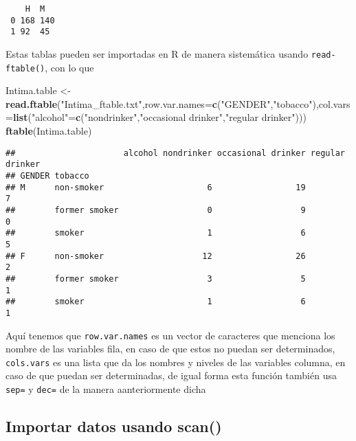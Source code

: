 \documentclass[]{article}
\newenvironment{Shaded}{\begin{snugshade}}{\end{snugshade}}
\newcommand{\KeywordTok}[1]{\textcolor[rgb]{0.13,0.29,0.53}{\textbf{#1}}}
\newcommand{\DataTypeTok}[1]{\textcolor[rgb]{0.13,0.29,0.53}{#1}}
\newcommand{\StringTok}[1]{\textcolor[rgb]{0.31,0.60,0.02}{#1}}
\newcommand{\NormalTok}[1]{#1}
\begin{document}
\begin{verbatim}
    H  M
 0 168 140
 1 92  45
\end{verbatim}

Estas tablas pueden ser importadas en R de manera sistemática usando
\texttt{read-ftable()}, con lo que

\begin{Shaded}
\begin{Highlighting}[]
\NormalTok{Intima.table <-}\StringTok{ }\KeywordTok{read.ftable}\NormalTok{(}\StringTok{"Intima_ftable.txt"}\NormalTok{,}\DataTypeTok{row.var.names=}\KeywordTok{c}\NormalTok{(}\StringTok{"GENDER"}\NormalTok{,}\StringTok{"tobacco"}\NormalTok{),}\DataTypeTok{col.vars=}\KeywordTok{list}\NormalTok{(}\StringTok{"alcohol"}\NormalTok{=}\KeywordTok{c}\NormalTok{(}\StringTok{"nondrinker"}\NormalTok{,}\StringTok{"occasional drinker"}\NormalTok{,}\StringTok{"regular drinker"}\NormalTok{)))}
\KeywordTok{ftable}\NormalTok{(Intima.table)}
\end{Highlighting}
\end{Shaded}

\begin{verbatim}
##                      alcohol nondrinker occasional drinker regular drinker
## GENDER tobacco                                                            
## M      non-smoker                     6                 19               7
##        former smoker                  0                  9               0
##        smoker                         1                  6               5
## F      non-smoker                    12                 26               2
##        former smoker                  3                  5               1
##        smoker                         1                  6               1
\end{verbatim}

Aquí tenemos que \texttt{row.var.names} es un vector de caracteres que
menciona los nombre de las variables fila, en caso de que estos no
puedan ser determinados, \texttt{cols.vars} es una lista que da los
nombres y niveles de las variables columna, en caso de que puedan ser
determinadas, de igual forma esta función también usa \texttt{sep=} y
\texttt{dec=} de la manera aanteriormente dicha

\subsection{Importar datos usando
scan()}\label{importar-datos-usando-scan}
\end{document}
